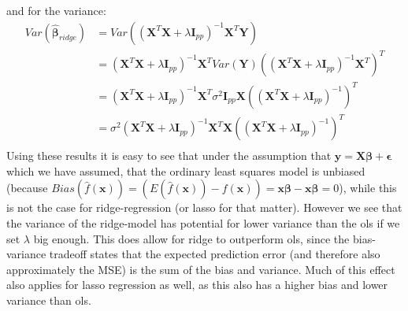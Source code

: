 \documentclass{article}
\begin{document}
and for the variance:
\begin{align*}
    Var(\hat{\bm{\beta}}_{ridge}) & = Var((\mathbf{X}^T \mathbf{X} + \lambda \mathbf{I}_{p p})^{-1} \mathbf{X}^T \mathbf{Y})                                                                                    \\
                                  & = (\mathbf{X}^T \mathbf{X} + \lambda \mathbf{I}_{p p})^{-1} \mathbf{X}^T Var(\mathbf{Y})  ((\mathbf{X}^T \mathbf{X} + \lambda \mathbf{I}_{p p})^{-1} \mathbf{X}^T)^T        \\
                                  & = (\mathbf{X}^T \mathbf{X} + \lambda \mathbf{I}_{p p})^{-1} \mathbf{X}^T \sigma^2 \mathbf{I}_{p p} \mathbf{X} ((\mathbf{X}^T \mathbf{X} + \lambda \mathbf{I}_{p p})^{-1})^T \\
                                  & = \sigma^2 (\mathbf{X}^T \mathbf{X} + \lambda \mathbf{I}_{p p})^{-1} \mathbf{X}^T \mathbf{X} ((\mathbf{X}^T \mathbf{X} + \lambda \mathbf{I}_{p p})^{-1})^T                  \\
\end{align*}
Using these results it is easy to see that under the assumption that $\mathbf{y}
    = \mathbf{X}\bm{\beta} + \bm{\epsilon}$ which we have assumed, that the ordinary
least squares model is unbiased (because $Bias(\hat{f}(\mathbf{x})) =
    (E(\hat{f}(\mathbf{x})) - f(\mathbf{x})) = \mathbf{x} \bm{\beta} - \mathbf{x}
    \bm{\beta} = 0$), while this is not the case for ridge-regression (or lasso for
that matter). However we see that the variance of the ridge-model has potential
for lower variance than the ols if we set $\lambda$ big enough. This does allow
for ridge to outperform ols, since the bias-variance tradeoff states that the
expected prediction error (and therefore also approximately the MSE) is the sum
of the bias and variance. Much of this effect also applies for lasso regression
as well, as this also has a higher bias and lower variance than ols.
\end{document}

